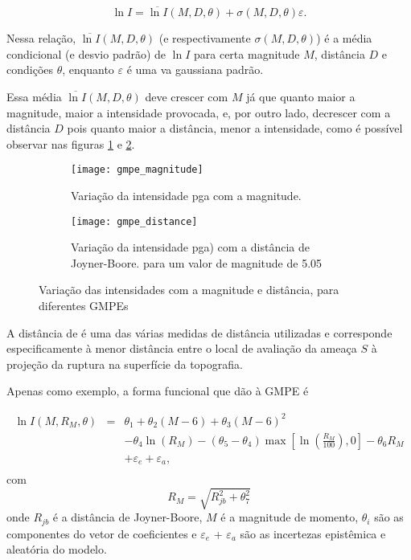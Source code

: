 \begin{equation} \label{pgamodel}
\ln I = \overline{\ln I}(M, D, \theta) + \sigma(M, D, \theta) \varepsilon.
\end{equation}

Nessa relação, $\overline{\ln I}(M, D, \theta)$ (e respectivamente $\sigma(M, D, \theta)$)
é a média condicional (e desvio padrão) de $\ln I$ para certa magnitude $M$, distância $D$
e condições $\theta$, enquanto $\varepsilon$ é uma \gls{va} gaussiana padrão.

Essa média $\overline{\ln I}(M, D, \theta)$ deve crescer com $M$ já que quanto maior a magnitude,
maior a intensidade provocada, e, por outro lado, decrescer com a distância $D$ pois quanto maior a distância, menor
a intensidade, como é possível observar nas figuras \ref{fig:gmpe_magnitude} e \ref{fig:gmpe_distance}.

\begin{figure}[H]
	\centering
	\begin{subfigure}[t]{0.47\textwidth}
		\centering
		\texttt{[image: gmpe\_magnitude]}
		\caption{Variação da intensidade \gls{pga} com a magnitude.}
		\label{fig:gmpe_magnitude}
	\end{subfigure}
	\quad
	\begin{subfigure}[t]{0.47\textwidth}
		\centering
		\texttt{[image: gmpe\_distance]}
		\caption{Variação da intensidade \gls{pga}) com a distância de Joyner-Boore.
		  para um valor de magnitude de 5.05 }
		\label{fig:gmpe_distance}
	\end{subfigure}
	\caption{Variação das intensidades com a magnitude e distância, para diferentes GMPEs}
	\label{fig:gmpe}
\end{figure}

A distância de \citet{joyner_1981} é uma das várias medidas de distância utilizadas e corresponde especificamente à
menor distância entre o local de avaliação da ameaça $S$ à projeção da ruptura na superfície da topografia.

Apenas como exemplo, a forma funcional que \citet{toro_1997} dão à GMPE é

\begin{equation}
\begin{array}{lcl}
\ln I(M, R_M, \theta)
&=& \theta_1 + \theta_2(M-6) + \theta_3(M-6)^2  \\
& & - \theta_4\ln (R_M) -(\theta_5 - \theta_4)\max\left[ \ln\left( \frac{R_M}{100} \right), 0 \right] -\theta_6 R_M \\
& & + \varepsilon_e + \varepsilon_a, \\
\end{array}
\end{equation}
com
$$
R_M =  \sqrt{ R_{jb}^2 + \theta_7^2 }
$$
onde $R_{jb}$ é a distância de Joyner-Boore, $M$ é a magnitude de momento,
$\theta_i$ são as componentes do vetor de coeficientes e $\varepsilon_e$ + $\varepsilon_a$
são as incertezas epistêmica e aleatória do modelo.


